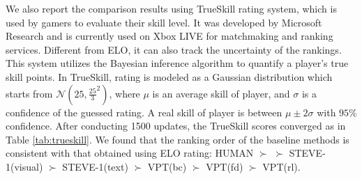 \documentclass[11pt, a4paper, logo, one column]{craftjarvis}
\begin{document}
We also report the comparison results using TrueSkill  rating system, which is used by gamers to evaluate their skill level. It was developed by Microsoft Research and is currently used on Xbox LIVE for matchmaking and ranking services. Different from ELO, it can also track the uncertainty of the rankings. This system utilizes the Bayesian inference algorithm to quantify a player's true skill points. 
In TrueSkill, rating is modeled as a Gaussian distribution which starts from $\mathcal{N}(25,\frac{25}{3}^2)$, where $\mu$ is an average skill of player, and $\sigma$ is a confidence of the guessed rating. A real skill of player is between $\mu \pm 2\sigma$ with $95\%$ confidence. After conducting 1500 updates, the TrueSkill scores converged as in Table \ref{tab:trueskill}. We found that the ranking order of the baseline methods is consistent with that obtained using ELO rating: HUMAN $\succ$ \agent $\succ$ STEVE-1(visual) $\succ$ STEVE-1(text) $\succ$ VPT(bc) $\succ$ VPT(fd) $\succ$ VPT(rl).  



\begin{table}[h]
\footnotesize
\caption{TrueSkill rating comparison on the Minecraft SkillForge benchmark.} \label{tab:trueskill}
\end{table}



\end{document}
